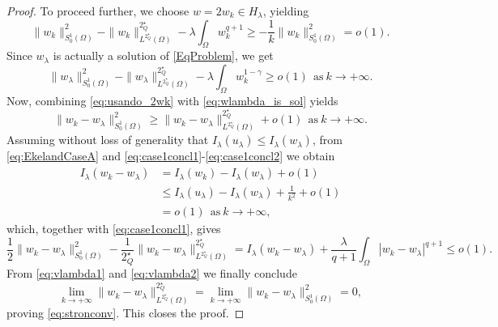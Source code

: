 \documentclass[11pt]{amsart}
\numberwithin{equation}{section} %
\theoremstyle{definition}
\def\G{\mathbb{G}}
\newcommand{\m}{\mbox}
\begin{document}
\begin{proof}
\noindent To proceed further, we choose $w=2w_k\in H_\lambda$,
yielding
\begin{equation}\label{eq:usando_2wk}
\|w_k\|_{S^{1}_{0}(\Omega)}^2-\|w_k\|_{L^{2^\star_Q}(\Omega)}^{2^\star_Q}-\lambda\int_\Omega w_k^{q+1}\geq-\frac{1}{k}\|w_k\|_{S^{1}_{0}(\Omega)}^2=o(1).
\end{equation}
Since $w_{\lambda}$ is actually a solution of \eqref{EqProblem}, we get
\begin{equation}\label{eq:wlambda_is_sol}
\|w_\lambda\|_{S^{1}_{0}(\Omega)}^2-\|w_\lambda\|_{L^{2^\star_Q}(\Omega)}^{2^\star_Q}-\lambda\int_\Omega w_k^{1-\gamma}\geq o(1)\ \ \m{as}\ k\to+\infty.
\end{equation}
Now, combining \eqref{eq:usando_2wk} with \eqref{eq:wlambda_is_sol} yields
 \begin{equation}\label{eq:vlambda1}
 	\|w_k-w_\lambda\|_{S^{1}_{0}(\Omega)}^2\geq \|w_k-w_\lambda\|_{L^{2^\star_Q}(\Omega)}^{2^\star_Q}+o(1)\ \ \m{as}\ k\to+\infty.
 \end{equation}
 Assuming without loss of generality that $I_\lambda(u_\lambda)\leq I_\lambda(w_\lambda)$,
 from \eqref{eq:EkelandCaseA} and \eqref{eq:case1concl1}-\eqref{eq:case1concl2}
 we obtain
 \[
 \begin{split}
 	I_\lambda(w_k-w_\lambda)&=I_\lambda(w_k)-I_\lambda(w_\lambda)+o(1)\\
 	&\leq I_\lambda(u_\lambda)-I_\lambda(w_\lambda)+\frac{1}{k^2}+o(1)\\
 	&=o(1)\ \ \m{as}\ k\to+\infty,
 \end{split}
 \]
 which, together with \eqref{eq:case1concl1}, gives
 \begin{equation}\label{eq:vlambda2}
 	\frac{1}{2}\|w_k-w_\lambda\|_{S^{1}_{0}(\Omega)}^2-\frac{1}{2^\star_Q}\|w_k-w_\lambda\|^{2^\star_Q}_{L^{2^\star_Q}(\Omega)}=
 	I_\lambda(w_k-w_\lambda)+\frac{\lambda}{q+1}\int_\Omega|w_k-w_\lambda|^{q+1}\leq o(1).
 \end{equation}
 From \eqref{eq:vlambda1} and \eqref{eq:vlambda2}
 we finally conclude
 \[
 \lim_{k\to+\infty}\|w_k-w_\lambda\|_{L^{2^\star_Q}(\Omega)}^{2^\star_Q}=\lim_{k\to+\infty}\|w_k-w_\lambda\|_{S^{1}_{0}(\Omega)}^2=0,
 \]
 proving \eqref{eq:stronconv}. This closes the proof.
\end{proof}
 
\end{document}
